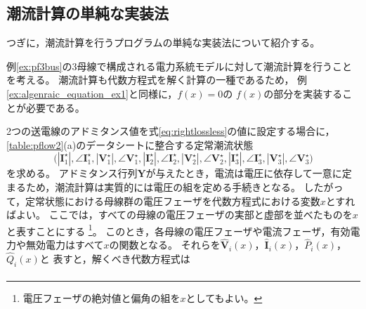 \documentclass[tombow,dvipdfmx]{corona-a5-1.1}
\begin{document}
\subsection{潮流計算の単純な実装法}

つぎに，潮流計算を行うプログラムの単純な実装法について紹介する。
\begin{例}[潮流計算の実装法]\label{ex:simplepowerflow}
例\ref{ex:pf3bus}の3母線で構成される電力系統モデルに対して潮流計算を行うことを考える。
潮流計算も代数方程式を解く計算の一種であるため，
例\nobreak\ref{ex:algenraic_equation_ex1}と同様に，$f(x)=0$の
$f(x)$の部分を実装することが必要である。

2つの送電線のアドミタンス値を式\ref{eq:rightlossless}の値に設定する場合に，\ref{table:pflow2}(a)のデータシートに整合する定常潮流状態
\[
\bigl(
|\bm{I}_1^{\star}|,\angle \bm{I}_1^{\star},
|\bm{V}_1^{\star}|,\angle \bm{V}_1^{\star},
|\bm{I}_2^{\star}|,\angle \bm{I}_2^{\star},
|\bm{V}_2^{\star}|,\angle \bm{V}_2^{\star},
|\bm{I}_3^{\star}|,\angle \bm{I}_3^{\star},
|\bm{V}_3^{\star}|,\angle \bm{V}_3^{\star}
\bigr)
\]
を求める。
アドミタンス行列$\bm Y$が与えたとき，電流は電圧に依存して一意に定まるため，潮流計算は実質的には電圧の組を定める手続きとなる。
したがって，定常状態における母線群の電圧フェーザを代数方程式における変数$x$とすればよい。
ここでは，すべての母線の電圧フェーザの実部と虚部を並べたものを$x$と表すことにする
\footnote{電圧フェーザの絶対値と偏角の組を$x$としてもよい。}。
このとき，各母線の電圧フェーザや電流フェーザ，有効電力や無効電力はすべて$x$の関数となる。
それらを$\hat{\bm V}_i(x)$，$\hat{\bm I}_i(x)$，$\hat{P}_i(x)$，$\hat{Q}_i(x)$と
表すと，解くべき代数方程式は
\begin{align*}

\end{align*}
\end{例}
\end{document}
